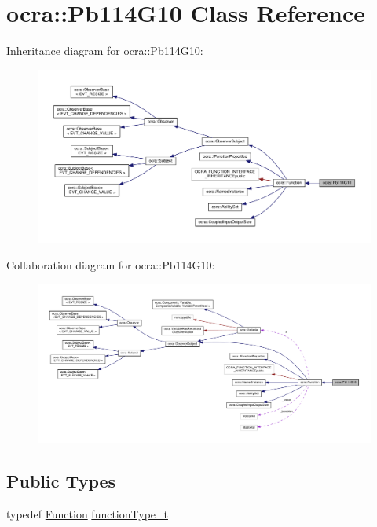 \hypertarget{classocra_1_1Pb114G10}{}\section{ocra\+:\+:Pb114\+G10 Class Reference}
\label{classocra_1_1Pb114G10}


Inheritance diagram for ocra\+:\+:Pb114\+G10\+:
\nopagebreak
\begin{figure}[H]
\begin{center}
\leavevmode
\includegraphics[width=350pt]{d5/d32/classocra_1_1Pb114G10__inherit__graph}
\end{center}
\end{figure}


Collaboration diagram for ocra\+:\+:Pb114\+G10\+:
\nopagebreak
\begin{figure}[H]
\begin{center}
\leavevmode
\includegraphics[width=350pt]{d7/d0d/classocra_1_1Pb114G10__coll__graph}
\end{center}
\end{figure}
\subsection*{Public Types}
\begin{DoxyCompactItemize}
\item 
typedef \hyperlink{classocra_1_1Function}{Function} \hyperlink{classocra_1_1Pb114G10_abefa27aa6362ee95d59c39654bd7ab2f}{function\+Type\+\_\+t}
\end{DoxyCompactItemize}
